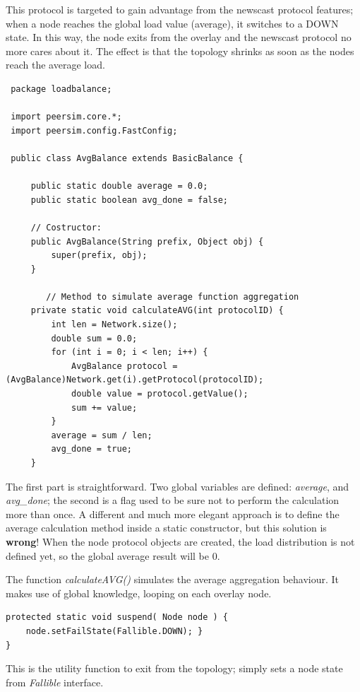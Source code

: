 \documentclass[a4paper,11pt]{article}
\begin{document}
This protocol is targeted to gain advantage from the newscast protocol
features; when a node reaches the global load value (average), it
switches to a DOWN state. In this way, the node exits from the overlay
and the newscast protocol no more cares about it. The effect is that
the topology shrinks as soon as the nodes reach the average load.

\footnotesize
\begin{verbatim}
 package loadbalance;

 import peersim.core.*;
 import peersim.config.FastConfig;
 
 public class AvgBalance extends BasicBalance {
 
     public static double average = 0.0;
     public static boolean avg_done = false;
     
     // Costructor:
     public AvgBalance(String prefix, Object obj) {
         super(prefix, obj);
     }
 
        // Method to simulate average function aggregation
     private static void calculateAVG(int protocolID) {
         int len = Network.size();
         double sum = 0.0;
         for (int i = 0; i < len; i++) {
             AvgBalance protocol = (AvgBalance)Network.get(i).getProtocol(protocolID);
             double value = protocol.getValue();
             sum += value;
         }
         average = sum / len;
         avg_done = true;
     }
\end{verbatim}
\normalsize


The first part is straightforward. Two global variables are defined:
\emph{average}, and \emph{avg\_done}; the second is a flag used to be sure not to
perform the calculation more than once. A different and much more
elegant approach is to define the average calculation method inside
a static constructor, but this solution is \textbf{wrong}! When the
node protocol objects are created, the load distribution is not defined
yet, so the global average result will be 0.

The function \emph{calculateAVG()} simulates the average aggregation
behaviour. It makes use of global knowledge, looping on each overlay
node. 

\footnotesize
\begin{verbatim}
protected static void suspend( Node node ) {
    node.setFailState(Fallible.DOWN); }
}
\end{verbatim}
\normalsize

This is the utility function to exit from the topology; simply sets
a node state from \emph{Fallible} interface.
\end{document}
